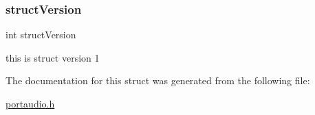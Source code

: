 \subsubsection{\texorpdfstring{struct\+Version}{structVersion}}
{\footnotesize\ttfamily int struct\+Version}

this is struct version 1 

The documentation for this struct was generated from the following file\+:\begin{DoxyCompactItemize}
\item 
\hyperlink{portaudio_8h}{portaudio.\+h}\end{DoxyCompactItemize}
